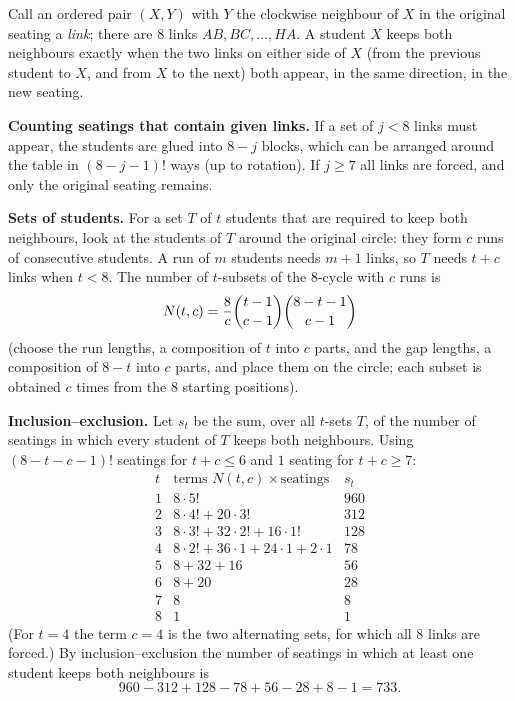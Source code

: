 Call an ordered pair $(X,Y)$ with $Y$ the clockwise neighbour of $X$ in the original seating a \emph{link}; there are $8$ links $AB,BC,\dots,HA$. A student $X$ keeps both neighbours exactly when the two links on either side of $X$ (from the previous student to $X$, and from $X$ to the next) both appear, in the same direction, in the new seating.

\textbf{Counting seatings that contain given links.} If a set of $j<8$ links must appear, the students are glued into $8-j$ blocks, which can be arranged around the table in $(8-j-1)!$ ways (up to rotation). If $j\ge7$ all links are forced, and only the original seating remains.

\textbf{Sets of students.} For a set $T$ of $t$ students that are required to keep both neighbours, look at the students of $T$ around the original circle: they form $c$ runs of consecutive students. A run of $m$ students needs $m+1$ links, so $T$ needs $t+c$ links when $t<8$. The number of $t$-subsets of the $8$-cycle with $c$ runs is
\[
N(t,c)=\dfrac{8}{c}\dbinom{t-1}{c-1}\dbinom{8-t-1}{c-1}
\]
(choose the run lengths, a composition of $t$ into $c$ parts, and the gap lengths, a composition of $8-t$ into $c$ parts, and place them on the circle; each subset is obtained $c$ times from the $8$ starting positions).

\textbf{Inclusion--exclusion.} Let $s_t$ be the sum, over all $t$-sets $T$, of the number of seatings in which every student of $T$ keeps both neighbours. Using $(8-t-c-1)!$ seatings for $t+c\le6$ and $1$ seating for $t+c\ge7$:
\[
\begin{array}{c|l|r}
t & \text{terms } N(t,c)\times\text{seatings} & s_t\\ \hline
1 & 8\cdot5! & 960\\
2 & 8\cdot4!+20\cdot3! & 312\\
3 & 8\cdot3!+32\cdot2!+16\cdot1! & 128\\
4 & 8\cdot2!+36\cdot1+24\cdot1+2\cdot1 & 78\\
5 & 8+32+16 & 56\\
6 & 8+20 & 28\\
7 & 8 & 8\\
8 & 1 & 1
\end{array}
\]
(For $t=4$ the term $c=4$ is the two alternating sets, for which all $8$ links are forced.) By inclusion--exclusion the number of seatings in which at least one student keeps both neighbours is
\[
960-312+128-78+56-28+8-1=\boxed{733}.
\]
